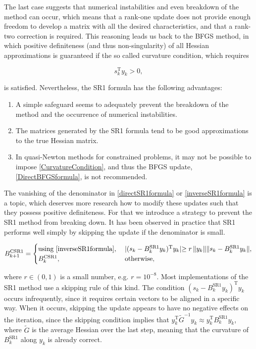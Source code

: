The last case suggests that numerical instabilities and even breakdown of the method can occur, which means that a rank-one update does not provide enough freedom to develop a matrix with all the desired characteristics, and that a rank-two correction is required. This reasoning leads us back to the BFGS method, in which positive definiteness (and thus non-singularity) of all Hessian approximations is guaranteed if the so called curvature condition, which requires

\begin{equation}\label{CurvatureCondition}
    s^{\mathrm{T}}_k y_k > 0,
\end{equation}

is satisfied. Nevertheless, the SR1 formula has the following advantages:

\begin{enumerate}
    \item A simple safeguard seems to adequately prevent the breakdown of the method and the occurrence of numerical instabilities.
    \item The matrices generated by the SR1 formula tend to be good approximations to the true Hessian matrix.
    \item In quasi-Newton methods for constrained problems, it may not be possible to impose \cref{CurvatureCondition}, and thus the BFGS update, \cref{DirectBFGSformula}, is not recommended. 
\end{enumerate}


The vanishing of the denominator in \cref{directSR1formula} or \cref{inverseSR1formula} is a topic, which deserves more research how to modify these updates such that they possess positive definiteness. For that we introduce a strategy to prevent the SR1 method from breaking down. It has been observed in practice that SR1 performs well simply by skipping the update if the denominator is small. 

\begin{equation}\label{CautiousSR1}
    B^\mathrm{CSR1}_{k+1} = \begin{cases} \text{using \cref{inverseSR1formula}}, & \; \lvert (s_k - B^\mathrm{SR1}_k y_k)^{\mathrm{T}} y_k \lvert \geq r \, \lVert y_k \rVert \lVert s_k - B^\mathrm{SR1}_k y_k \rVert , \\ B^\mathrm{CSR1}_k, & \; \text{otherwise}, \end{cases}
\end{equation}

where $r \in (0, 1)$ is a small number, e.g. $r = 10^{−8}$. Most implementations of the SR1 method use a skipping rule of this kind. The condition $(s_k - B^\mathrm{SR1}_k y_k)^{\mathrm{T}} y_k$ occurs infrequently, since it requires certain vectors to be aligned in a specific way. When it occurs, skipping the update appears to have no negative effects on the iteration, since the skipping condition implies that $y^{\mathrm{T}}_k \tilde{G}^{-1} y_k \approx y^{\mathrm{T}}_k B^\mathrm{SR1}_k y_k$, where $\tilde{G}$ is the average Hessian over the last step, meaning that the curvature of $B^\mathrm{SR1}_k$ along $y_k$ is already correct. 

